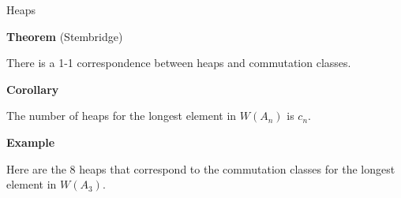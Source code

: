 \documentclass[10pt, compress,aspectratio=169,handout]{beamer}
\begin{document}
\begin{frame}{Heaps}\pause

\vspace{1em}

\begin{block}{\textbf{Theorem} (Stembridge)}

\vspace{-.5em}

There is a 1-1 correspondence between heaps and commutation classes.
\end{block}

\pause

\begin{block}{\textbf{Corollary}}

\vspace{-.5em}

The number of heaps for the longest element in $W(A_n)$ is $c_n$.
\end{block}

\pause

\begin{block}{\textbf{Example}}

\vspace{-.5em}

Here are the 8 heaps that correspond to the commutation classes for the longest element in $W(A_3)$.

\vspace{-1em}


\end{block}
\end{frame}
\end{document}
